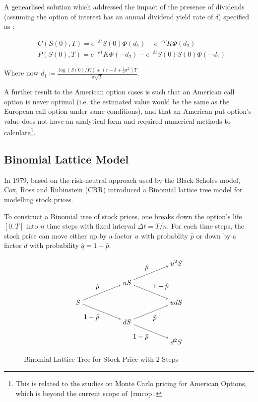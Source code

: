 A genearlised solution which addressed the impact of the presence of dividends (assuming the option of interest has an annual dividend yield rate of $\delta$) specified as \cite{Glasserman2003}:

\begin{align}
	&C(S(0), T) = e^{-\delta t}S(0)\Phi(d_1) - e^{-rT}K\Phi(d_2) \label{eq:BS Formula Call} \\
	&P(S(0), T) = e^{-rT}K\Phi(-d_2) - e^{-\delta t}S(0)S(0)\Phi(-d_1) \label{eq:BS Formula Put}
\end{align}

Where now $d_1 \coloneqq \frac{\log(S(0)/K)+(r-\delta+\frac{1}{2}\sigma^2)T}{\sigma\sqrt{T}}$.

A further result to the American option cases is such that an American call option is never optimal (i.e. the estimated value would be the same as the European call option under same conditions), and that an American put option's value does not have an analytical form and required numerical methods to calculate\footnote{This is related to the studies on Monte Carlo pricing for American Options, which is beyond the current scope of \texttt|rmcop|.}.

\subsection{Binomial Lattice Model}

In 1979, based on the risk-neutral approach used by the Black-Scholes model, Cox, Ross and Rubinstein (CRR) \cite{CRR1979} introduced a Binomial lattice tree model for modelling stock prices.

To construct a Binomial tree of stock prices, one breaks down the option's life $[0,T]$ into $n$ time steps with fixed interval $\Delta t=T/n$. For each time steps, the stock price can move either up by a factor $u$ with probablity $\hat{p}$ or down by a factor $d$ with probability $\hat{q}=1-\hat{p}$.

\begin{figure}[H]
    \centering
    \[\tikz{
        \node (a) at (0, 2) {$S$};
        \node (b) at (2.5, 3) {$uS$};
        \node (c) at (2.5, 1) {$dS$};
		\node (d) at (5, 4) {$u^2S$};
        \node (e) at (5, 2) {$udS$};
		\node (f) at (5, 0) {$d^2S$};
        \path[->] (a) edge node [above left] {$\hat{p}$} (b)
				  (a) edge node [below left] {$1-\hat{p}$} (c);
		\path[->] (b) edge node [above left] {$\hat{p}$} (d)
        		  (b) edge node [above right] {$1-\hat{p}$} (e);
		\path[->] (c) edge node [below right] {$\hat{p}$} (e)
        		  (c) edge node [below left] {$1-\hat{p}$} (f);
    }\]
    \caption{Binomial Lattice Tree for Stock Price with 2 Steps} \label{gph:binomial_tree}
\end{figure}

